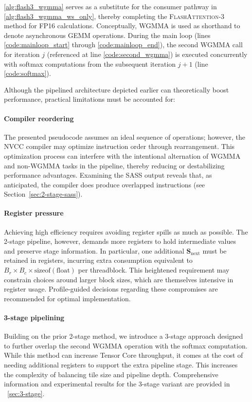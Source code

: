 \cref{alg:flash3_wgmma} serves as a substitute for the consumer pathway in \cref{alg:flash3_wgmma_ws_only}, thereby completing the \textsc{FlashAttention-3} method for FP16 calculations. Conceptually, WGMMA is used as shorthand to denote asynchronous GEMM operations. During the main loop (lines \ref{code:mainloop_start} through \ref{code:mainloop_end}), the second WGMMA call for iteration $j$ (referenced at line \ref{code:second_wgmma}) is executed concurrently with softmax computations from the subsequent iteration $j+1$ (line \ref{code:softmax}).

Although the pipelined architecture depicted earlier can theoretically boost performance, practical limitations must be accounted for:

\paragraph{Compiler reordering} The presented pseudocode assumes an ideal sequence of operations; however, the NVCC compiler may optimize instruction order through rearrangement. This optimization process can interfere with the intentional alternation of WGMMA and non-WGMMA tasks in the pipeline, thereby reducing or destabilizing performance advantages. Examining the SASS output reveals that, as anticipated, the compiler does produce overlapped instructions (see Section~\ref{sec:2-stage-sass}).

\paragraph{Register pressure} Achieving high efficiency requires avoiding register spills as much as possible. The 2-stage pipeline, however, demands more registers to hold intermediate values and preserve stage information. In particular, one additional $\mathbf{S}_{\mathrm{next}}$ must be retained in registers, incurring extra consumption equivalent to $B_r \times B_c \times \text{sizeof}(\text{float})$ per threadblock. This heightened requirement may constrain choices around larger block sizes, which are themselves intensive in register usage. Profile-guided decisions regarding these compromises are recommended for optimal implementation.

\paragraph{3-stage pipelining} Building on the prior 2-stage method, we introduce a 3-stage approach designed to further overlap the second WGMMA operation with the softmax computation. While this method can increase Tensor Core throughput, it comes at the cost of needing additional registers to support the extra pipeline stage. This increases the complexity of balancing tile size and pipeline depth. Comprehensive information and experimental results for the 3-stage variant are provided in ~\cref{sec:3-stage}.

